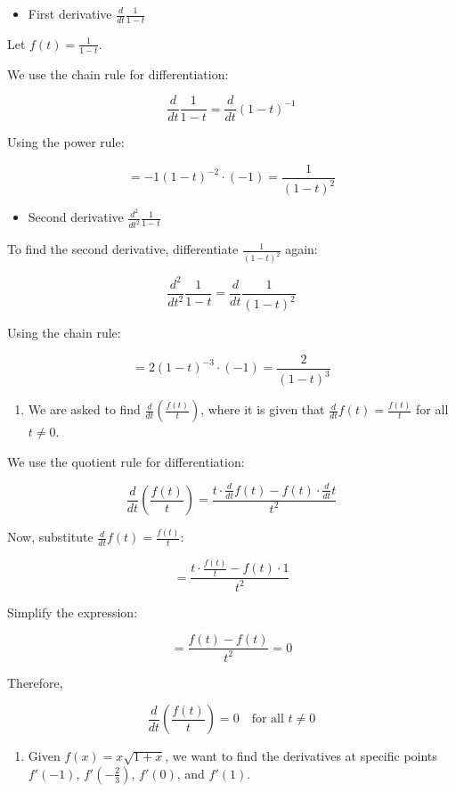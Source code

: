 \documentclass[
]{book}
\providecommand{\tightlist}{%
  \setlength{\itemsep}{0pt}\setlength{\parskip}{0pt}}
\theoremstyle{definition}
\theoremstyle{definition}
\theoremstyle{definition}
\theoremstyle{definition}
\theoremstyle{remark}
\begin{document}
\begin{itemize}
\tightlist
\item
  First derivative \(\frac{d}{dt} \frac{1}{1-t}\)
\end{itemize}

Let \(f(t) = \frac{1}{1-t}\).

We use the chain rule for differentiation:

\[
\frac{d}{dt} \frac{1}{1-t} = \frac{d}{dt} (1-t)^{-1}
\]

Using the power rule:

\[
= -1(1-t)^{-2} \cdot (-1) = \frac{1}{(1-t)^2}
\]

\begin{itemize}
\tightlist
\item
  Second derivative \(\frac{d^2}{dt^2} \frac{1}{1-t}\)
\end{itemize}

To find the second derivative, differentiate \(\frac{1}{(1-t)^2}\) again:

\[
\frac{d^2}{dt^2} \frac{1}{1-t} = \frac{d}{dt} \frac{1}{(1-t)^2}
\]

Using the chain rule:

\[
= 2(1-t)^{-3} \cdot (-1) = \frac{2}{(1-t)^3}
\]

\begin{enumerate}
\def\labelenumi{\arabic{enumi}.}
\setcounter{enumi}{3}
\tightlist
\item
  We are asked to find \(\frac{d}{dt} \left( \frac{f(t)}{t} \right)\), where it is given that \(\frac{d}{dt} f(t) = \frac{f(t)}{t}\) for all \(t \neq 0\).
\end{enumerate}

We use the quotient rule for differentiation:

\[
\frac{d}{dt} \left( \frac{f(t)}{t} \right) = \frac{t \cdot \frac{d}{dt} f(t) - f(t) \cdot \frac{d}{dt} t}{t^2}
\]

Now, substitute \(\frac{d}{dt} f(t) = \frac{f(t)}{t}\):

\[
= \frac{t \cdot \frac{f(t)}{t} - f(t) \cdot 1}{t^2}
\]

Simplify the expression:

\[
= \frac{f(t) - f(t)}{t^2} = 0
\]

Therefore,

\[
\frac{d}{dt} \left( \frac{f(t)}{t} \right) = 0 \quad \text{for all } t \neq 0
\]

\begin{enumerate}
\def\labelenumi{\arabic{enumi}.}
\setcounter{enumi}{4}
\tightlist
\item
  Given \(f(x) = x\sqrt{1+x}\), we want to find the derivatives at specific points \(f'(-1)\), \(f'(-\frac{2}{3})\), \(f'(0)\), and \(f'(1)\).
\end{enumerate}
\end{document}
